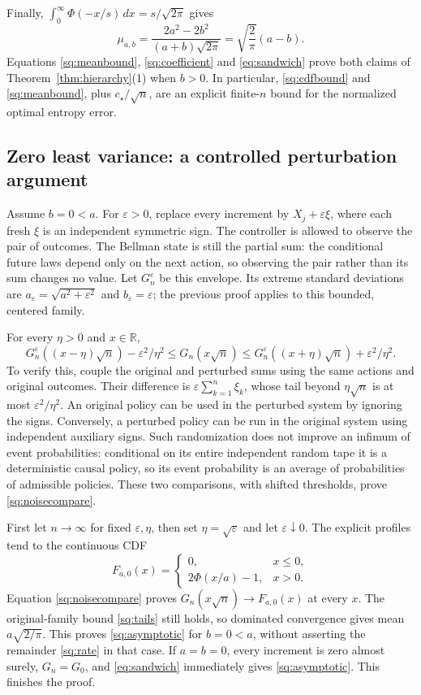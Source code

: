 \documentclass[11pt,a4paper]{article}
\theoremstyle{definition}\newtheorem{definition}[theorem]{Definition}
\theoremstyle{remark}\newtheorem{remark}[theorem]{Remark}
\newcommand{\R}{\mathbb R}
\newcommand{\cstar}{c_\star}
\numberwithin{equation}{section}
\begin{document}
Finally, $\int_0^\infty\Phi(-x/s)\,dx=s/\sqrt{2\pi}$ gives
\begin{equation}\label{sq:coefficient}
 \mu_{a,b}
 =\frac{2a^2-2b^2}{(a+b)\sqrt{2\pi}}
 =\sqrt{\frac2\pi}(a-b).
\end{equation}
Equations \eqref{sq:meanbound}, \eqref{sq:coefficient} and \eqref{eq:sandwich}
prove both claims of Theorem~\ref{thm:hierarchy}(1) when $b>0$. In particular,
\eqref{sq:cdfbound} and \eqref{sq:meanbound}, plus $\cstar/\sqrt n$, are an
explicit finite-$n$ bound for the normalized optimal entropy error.

\subsection{Zero least variance: a controlled perturbation argument}
Assume $b=0<a$. For $\varepsilon>0$, replace every increment by
$X_j+\varepsilon\xi$, where each fresh $\xi$ is an independent symmetric
sign. The controller is allowed to observe the pair of outcomes. The Bellman
state is still the partial sum: the conditional future laws depend only on
the next action, so observing the pair rather than its sum changes no value.
Let $G_n^\varepsilon$ be this envelope. Its extreme standard deviations are
$a_\varepsilon=\sqrt{a^2+\varepsilon^2}$ and $b_\varepsilon=\varepsilon$;
the previous proof applies to this bounded, centered family.

For every $\eta>0$ and $x\in\R$,
\begin{equation}\label{sq:noisecompare}
 G_n^\varepsilon((x-\eta)\sqrt n)-\varepsilon^2/\eta^2
 \le G_n(x\sqrt n)
 \le G_n^\varepsilon((x+\eta)\sqrt n)+\varepsilon^2/\eta^2.
\end{equation}
To verify this, couple the original and perturbed sums using the same
actions and original outcomes. Their difference is
$\varepsilon\sum_{k=1}^n\xi_k$, whose tail beyond $\eta\sqrt n$ is at most
$\varepsilon^2/\eta^2$. An original policy can be used in the perturbed
system by ignoring the signs. Conversely, a perturbed policy can be run in
the original system using independent auxiliary signs. Such randomization
does not improve an infimum of event probabilities: conditional on its
entire independent random tape it is a deterministic causal policy, so its
event probability is an average of probabilities of admissible policies.
These two comparisons, with shifted thresholds, prove \eqref{sq:noisecompare}.

First let $n\to\infty$ for fixed $\varepsilon,\eta$, then set
$\eta=\sqrt\varepsilon$ and let $\varepsilon\downarrow0$. The explicit
profiles tend to the continuous CDF
\[
 F_{a,0}(x)=\begin{cases}0,&x\le0,\\2\Phi(x/a)-1,&x>0.\end{cases}
\]
Equation \eqref{sq:noisecompare} proves $G_n(x\sqrt n)\to F_{a,0}(x)$ at
every $x$. The original-family bound \eqref{sq:tails} still holds, so dominated
convergence gives mean $a\sqrt{2/\pi}$. This proves \eqref{sq:asymptotic}
for $b=0<a$, without asserting the remainder \eqref{sq:rate} in that case.
If $a=b=0$, every increment is zero almost surely, $G_n=G_0$, and
\eqref{eq:sandwich} immediately gives \eqref{sq:asymptotic}. This finishes the proof.
\end{document}
